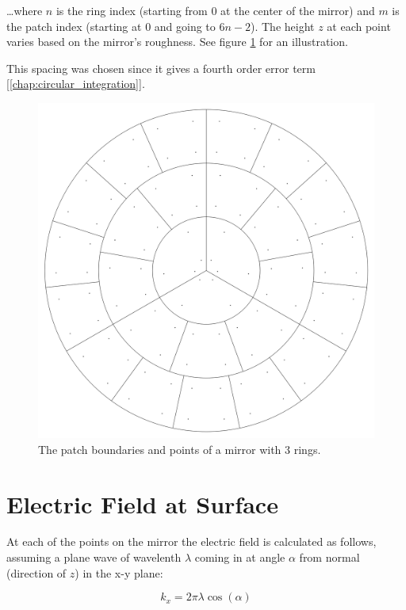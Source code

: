 \documentclass[etd,twoside,senior,noacknowledgments]{BYUPhys}
\begin{document}
\ldots where $n$ is the ring index (starting from 0 at the center of the mirror) and $m$ is the patch index (starting at 0 and going to $6n-2$). The height $z$ at each point varies based on the mirror's roughness. See figure \ref{fig:patches_points} for an illustration.

This spacing was chosen since it gives a fourth order error term [\ref{chap:circular_integration}].

\begin{figure}
  \centerline{\includegraphics[width=\textwidth]{circular-grid-with-points}}
  \caption[Mirror patch boundaries and point locations]{\label{fig:patches_points}
    The patch boundaries and points of a mirror with 3 rings.}
\end{figure}



\section{Electric Field at Surface}\label{chap:efield}

At each of the points on the mirror the electric field is calculated as follows, assuming a plane wave of wavelenth $\lambda$ coming in at angle $\alpha$ from normal (direction of $z$) in the x-y plane:

\begin{equation}
  k_{x}=2\pi\lambda\cos\left(\alpha\right)
\end{equation}
\end{document}
